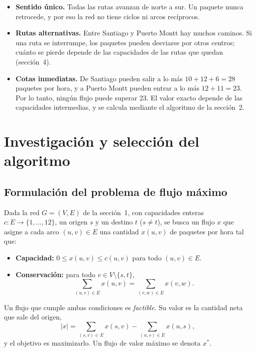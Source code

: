 \documentclass[12pt, a4paper]{article}
\begin{document}
\begin{itemize}
  \item \textbf{Sentido único.} Todas las rutas avanzan de norte a sur. Un paquete nunca retrocede, y por eso la red no tiene ciclos ni arcos recíprocos.
  \item \textbf{Rutas alternativas.} Entre Santiago y Puerto Montt hay muchos caminos. Si una ruta se interrumpe, los paquetes pueden desviarse por otros centros; cuánto se pierde depende de las capacidades de las rutas que quedan (sección~4).
  \item \textbf{Cotas inmediatas.} De Santiago pueden salir a lo más $10 + 12 + 6 = 28$ paquetes por hora, y a Puerto Montt pueden entrar a lo más $12 + 11 = 23$. Por lo tanto, ningún flujo puede superar 23. El valor exacto depende de las capacidades intermedias, y se calcula mediante el algoritmo de la sección~2.
\end{itemize}

\section{Investigación y selección del algoritmo}

\subsection{Formulación del problema de flujo máximo}

Dada la red $G = (V, E)$ de la sección~1, con capacidades enteras $c: E \to \{1, \dots, 12\}$, un origen $s$ y un destino $t$ ($s \ne t$), se busca un flujo $x$ que asigne a cada arco $(u,v) \in E$ una cantidad $x(u,v)$ de paquetes por hora tal que:
\begin{itemize}
  \item \textbf{Capacidad:} $0 \le x(u,v) \le c(u,v)$ para todo $(u,v) \in E$.
  \item \textbf{Conservación:} para todo $v \in V \setminus \{s,t\}$,
  \[
    \sum_{(u,v)\in E} x(u,v) = \sum_{(v,w)\in E} x(v,w).
  \]
\end{itemize}
Un flujo que cumple ambas condiciones es \emph{factible}. Su valor es la cantidad neta que sale del origen,
\[
  \lvert x\rvert = \sum_{(s,v)\in E} x(s,v) - \sum_{(u,s)\in E} x(u,s),
\]
y el objetivo es maximizarlo. Un flujo de valor máximo se denota $x^*$.
\end{document}
